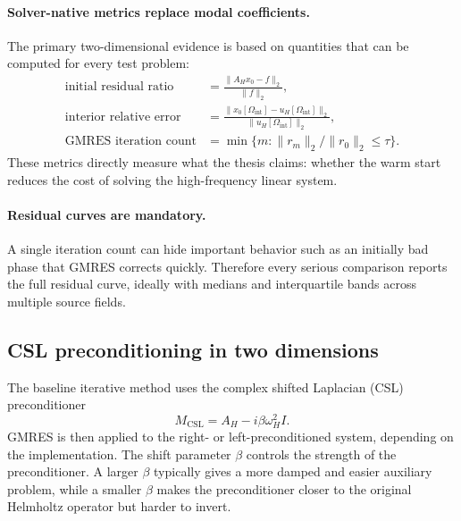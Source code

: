 \paragraph{Solver-native metrics replace modal coefficients.}
The primary two-dimensional evidence is based on quantities that can be
computed for every test problem:
\begin{align}
    \text{initial residual ratio}
    &=
    \frac{\|A_H x_0 - f\|_2}{\|f\|_2},
    \label{eq:twod_initial_residual}
    \\
    \text{interior relative error}
    &=
    \frac{\|x_0[\Omega_{\mathrm{int}}]
            - u_H[\Omega_{\mathrm{int}}]\|_2}
         {\|u_H[\Omega_{\mathrm{int}}]\|_2},
    \label{eq:twod_initial_error}
    \\
    \text{GMRES iteration count}
    &=
    \min \{m : \|r_m\|_2/\|r_0\|_2 \leq \tau\}.
    \label{eq:twod_iteration_count}
\end{align}
These metrics directly measure what the thesis claims: whether the warm start
reduces the cost of solving the high-frequency linear system.

\paragraph{Residual curves are mandatory.}
A single iteration count can hide important behavior such as an initially bad
phase that GMRES corrects quickly. Therefore every serious comparison reports
the full residual curve, ideally with medians and interquartile bands across
multiple source fields.


\subsection{CSL preconditioning in two dimensions}
\label{subsec:methodology_2d_csl}

The baseline iterative method uses the complex shifted Laplacian (CSL)
preconditioner
\begin{equation}
    M_{\mathrm{CSL}}
    =
    A_H - i\beta\omega_H^2 I.
    \label{eq:twod_csl}
\end{equation}
GMRES is then applied to the right- or left-preconditioned system, depending
on the implementation. The shift parameter $\beta$ controls the strength of
the preconditioner. A larger $\beta$ typically gives a more damped and easier
auxiliary problem, while a smaller $\beta$ makes the preconditioner closer to
the original Helmholtz operator but harder to invert.

